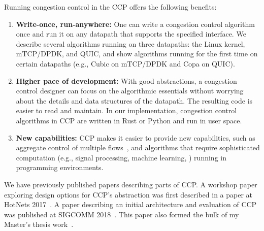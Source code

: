 \documentclass[fontsize=12pt,paper=letter]{scrartcl}
\begin{document}
Running congestion control in the CCP offers the following benefits:
\begin{enumerate}
    \item \textbf{Write-once, run-anywhere:} One can write a congestion control algorithm once and run it on any datapath that supports the specified interface. 
    We describe several algorithms running on three datapaths: the Linux kernel, mTCP/DPDK, and QUIC, and show algorithms running for the first time on certain datapaths (e.g., Cubic on mTCP/DPDK and Copa on QUIC).
    \item \textbf{Higher pace of development:} With good abstractions,
      a congestion control designer can focus on the algorithmic essentials
      without worrying about the details and data structures of the
      datapath. The resulting code is easier to read and maintain. In our implementation, congestion control algorithms in CCP are written in Rust or Python and run in user space. 
    \item \textbf{New capabilities:} CCP makes it easier to provide new
      capabilities, such as aggregate control of multiple flows~\cite{cm}, and algorithms that require sophisticated computation (e.g., signal processing, machine learning, \etc) running in \userspace programming environments. 
\end{enumerate}

We have previously published papers describing parts of CCP.
A workshop paper exploring design options for CCP's abstraction was first described in a paper at HotNets 2017~\cite{ccp-hotnets}. 
A paper describing an initial architecture and evaluation of CCP was published at SIGCOMM 2018~\cite{ccp-sigcomm}. 
This paper also formed the bulk of my Master's thesis work~\cite{akshayn-ms-thesis}.

%
\end{document}
